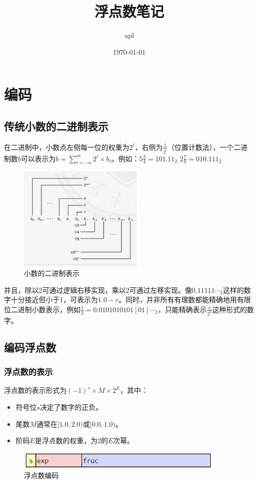\documentclass[a4paper, 12pt, UTF8]{ctexart}
\title{浮点数笔记}
\author{apl}
\date{\today}
\begin{document}
\maketitle
\tableofcontents

\section{编码}
\subsection{传统小数的二进制表示}
在二进制中，小数点左侧每一位的权重为\(2^{i}\)，右侧为\(\frac{1}{2^{i}}\)（位置计数法），一个二进制数\(b\)可以表示为\(b=\sum\limits_{i = -n}^{m}2^{i}\times b_{i}\)。例如：$5\frac{3}{4} = 101.11_{2}$
$2\frac{7}{8}= 010.111_{2}$
\begin{figure}[H]
    \centering
    \captionsetup{skip=4pt}
    \includegraphics[width=6cm]{figures/1.png}
    \caption{小数的二进制表示}
\end{figure}


并且，除以2可通过逻辑右移实现，乘以2可通过左移实现。像\(0.11111\cdots_{2}\)这样的数字十分接近但小于1，可表示为\(1.0-\varepsilon\)。同时，并非所有有理数都能精确地用有限位二进制小数表示，例如\(\frac{1}{3}=0.0101010101[01]\cdots_{2}\)，只能精确表示\(\frac{x}{2^{k}}\)这种形式的数字。

\subsection{编码浮点数}
\subsubsection{浮点数的表示}
浮点数的表示形式为\((-1)^{s}\times M\times2^{E}\)，其中：
\begin{itemize}
    \item 符号位\(s\)决定了数字的正负。
    \item 尾数\(M\)通常在\([1.0,2.0)\)或\([0.0,1.0)\)。
    \item 阶码\(E\)是浮点数的权重，为2的\(E\)次幂。
\end{itemize}
\begin{figure}[H]
    \centering
    \captionsetup{skip=4pt}
    \includegraphics[width=10cm]{2.png}
    \caption{浮点数编码}
\end{figure}
\end{document}
